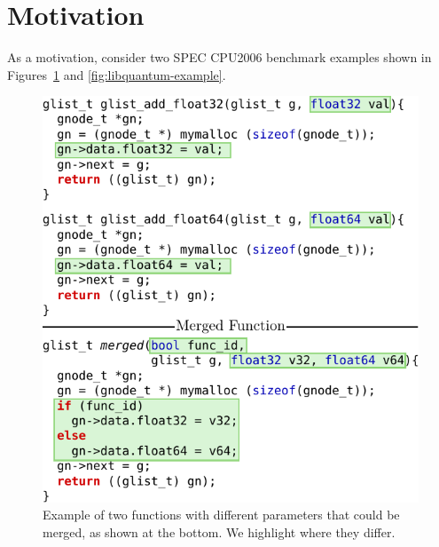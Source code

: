 
\section{Motivation} \label{sec:motivation}


As a motivation, consider two SPEC CPU2006 benchmark examples shown in Figures~\ref{fig:sphinx-example} and \ref{fig:libquantum-example}.

\begin{figure}[t!]
  \centering
  \includegraphics[width=.95\linewidth]{figs/sphinx-example.pdf}
  \caption{Example of two functions with different parameters that could be merged, as shown at the bottom.
           We highlight where they differ.}
  \label{fig:sphinx-example}
\end{figure}

